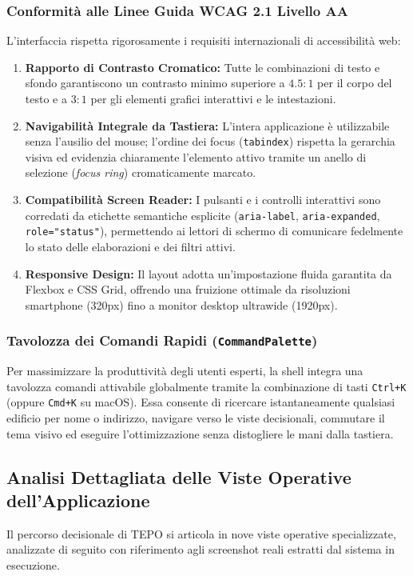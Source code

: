\subsubsection{Conformità alle Linee Guida WCAG 2.1 Livello AA}
L'interfaccia rispetta rigorosamente i requisiti internazionali di accessibilità web:
\begin{enumerate}[leftmargin=1.4em, itemsep=0.2em]
    \item \textbf{Rapporto di Contrasto Cromatico:} Tutte le combinazioni di testo e sfondo garantiscono un contrasto minimo superiore a $4.5:1$ per il corpo del testo e a $3:1$ per gli elementi grafici interattivi e le intestazioni.
    \item \textbf{Navigabilità Integrale da Tastiera:} L'intera applicazione è utilizzabile senza l'ausilio del mouse; l'ordine dei focus (\texttt{tabindex}) rispetta la gerarchia visiva ed evidenzia chiaramente l'elemento attivo tramite un anello di selezione (\emph{focus ring}) cromaticamente marcato.
    \item \textbf{Compatibilità Screen Reader:} I pulsanti e i controlli interattivi sono corredati da etichette semantiche esplicite (\texttt{aria-label}, \texttt{aria-expanded}, \texttt{role="status"}), permettendo ai lettori di schermo di comunicare fedelmente lo stato delle elaborazioni e dei filtri attivi.
    \item \textbf{Responsive Design:} Il layout adotta un'impostazione fluida garantita da Flexbox e CSS Grid, offrendo una fruizione ottimale da risoluzioni smartphone (320px) fino a monitor desktop ultrawide (1920px).
\end{enumerate}

\subsubsection{Tavolozza dei Comandi Rapidi (\texttt{CommandPalette})}
Per massimizzare la produttività degli utenti esperti, la shell integra una tavolozza comandi attivabile globalmente tramite la combinazione di tasti \texttt{Ctrl+K} (oppure \texttt{Cmd+K} su macOS). Essa consente di ricercare istantaneamente qualsiasi edificio per nome o indirizzo, navigare verso le viste decisionali, commutare il tema visivo ed eseguire l'ottimizzazione senza distogliere le mani dalla tastiera.

\subsection{Analisi Dettagliata delle Viste Operative dell'Applicazione}
Il percorso decisionale di TEPO si articola in nove viste operative specializzate, analizzate di seguito con riferimento agli screenshot reali estratti dal sistema in esecuzione.

